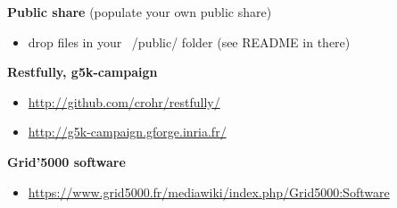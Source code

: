\textbf{Public share} (populate your own public share)
\begin{itemize}
\item drop files in your ~/public/ folder (see README in there)
\end{itemize}

\textbf{Restfully, g5k-campaign}
\begin{itemize}
\item \url{http://github.com/crohr/restfully/}
\item \url{http://g5k-campaign.gforge.inria.fr/}
\end{itemize}

\textbf{Grid'5000 software}
\begin{itemize}
\item \url{https://www.grid5000.fr/mediawiki/index.php/Grid5000:Software}
\end{itemize}\vspace{-1.5em}%